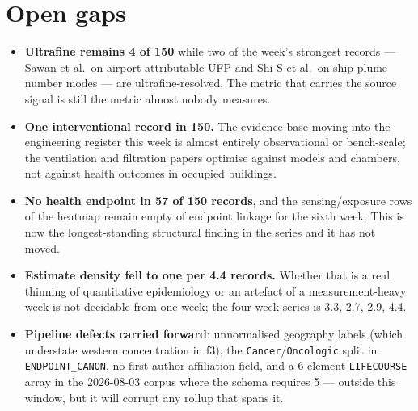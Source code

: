\documentclass[10pt]{article}
\begin{document}
\vspace{2mm}
\section*{\sffamily\bfseries\color{Deep}Open gaps}
\vspace{-1.5mm}{\color{Teal}\rule{\linewidth}{1.1pt}}\vspace{2.5mm}

\footnotesize
\begin{itemize}
\item \textbf{Ultrafine remains 4 of 150} while two of the week's strongest records ---
Sawan et al.\ on airport-attributable UFP and Shi S et al.\ on ship-plume number modes ---
are ultrafine-resolved. The metric that carries the source signal is still the metric
almost nobody measures.

\item \textbf{One interventional record in 150.} The evidence base moving into the
engineering register this week is almost entirely observational or bench-scale; the
ventilation and filtration papers optimise against models and chambers, not against
health outcomes in occupied buildings.

\item \textbf{No health endpoint in 57 of 150 records}, and the sensing/exposure rows of
the heatmap remain empty of endpoint linkage for the sixth week. This is now the
longest-standing structural finding in the series and it has not moved.

\item \textbf{Estimate density fell to one per 4.4 records.} Whether that is a real
thinning of quantitative epidemiology or an artefact of a measurement-heavy week is not
decidable from one week; the four-week series is 3.3, 2.7, 2.9, 4.4.

\item \textbf{Pipeline defects carried forward}: unnormalised geography labels (which
understate western concentration in f3), the \texttt{Cancer}/\texttt{Oncologic} split in
\texttt{ENDPOINT\_CANON}, no first-author affiliation field, and a 6-element
\texttt{LIFECOURSE} array in the 2026-08-03 corpus where the schema requires 5 --- outside
this window, but it will corrupt any rollup that spans it.
\end{itemize}

\clearpage

\end{document}

